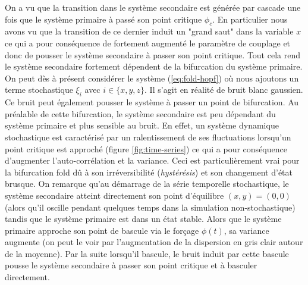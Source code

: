
On a vu que la transition dans le système secondaire est générée par cascade une fois que le système primaire à passé son point critique $\phi_c$. En particulier nous avons vu que la transition de ce dernier induit un "grand saut" dans la variable $x$ ce qui a pour conséquence de fortement augmenté le paramètre de couplage et donc de pousser le système secondaire à passer son point critique. Tout cela rend le système secondaire fortement dépendent de la bifurcation du système primaire.
On peut dès à présent considérer le système (\ref{eq:fold-hopf}) où nous ajoutons un terme stochastique $\xi_i$ avec $i \in \{x, y, z\}$. Il s'agit en réalité de bruit blanc gaussien. Ce bruit peut également pousser le système à passer un point de bifurcation.
Au préalable de cette bifurcation, le système secondaire est peu dépendant du système primaire et plus sensible au bruit. En effet, un système dynamique stochastique est caractérisé par un ralentissement de ses fluctuations lorsqu'un point critique est approché (figure \ref{fig:time-series}) ce qui a pour conséquence d'augmenter l'auto-corrélation et la variance. Ceci est particulièrement vrai pour la bifurcation fold dû à son irréversibilité (\emph{hystérésis}) et son changement d'état brusque. On remarque qu'au démarrage de la série temporelle stochastique, le système secondaire atteint directement son point d'équilibre $(x,y) = (0,0)$ (alors qu'il oscille pendant quelques temps dans la simulation non-stochastique) tandis que le système primaire est dans un état stable. Alors que le système primaire approche son point de bascule via le forçage $\phi(t)$, sa variance augmente (on peut le voir par l'augmentation de la dispersion en gris clair autour de la moyenne). Par la suite lorsqu'il bascule, le bruit induit par cette bascule pousse le système secondaire à passer son point critique et à basculer directement.
